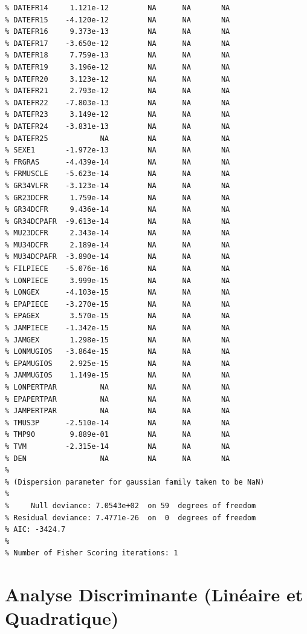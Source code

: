 \documentclass[
]{article}
\begin{document}
\begin{verbatim}
% DATEFR14     1.121e-12         NA      NA       NA
% DATEFR15    -4.120e-12         NA      NA       NA
% DATEFR16     9.373e-13         NA      NA       NA
% DATEFR17    -3.650e-12         NA      NA       NA
% DATEFR18     7.759e-13         NA      NA       NA
% DATEFR19     3.196e-12         NA      NA       NA
% DATEFR20     3.123e-12         NA      NA       NA
% DATEFR21     2.793e-12         NA      NA       NA
% DATEFR22    -7.803e-13         NA      NA       NA
% DATEFR23     3.149e-12         NA      NA       NA
% DATEFR24    -3.831e-13         NA      NA       NA
% DATEFR25            NA         NA      NA       NA
% SEXE1       -1.972e-13         NA      NA       NA
% FRGRAS      -4.439e-14         NA      NA       NA
% FRMUSCLE    -5.623e-14         NA      NA       NA
% GR34VLFR    -3.123e-14         NA      NA       NA
% GR23DCFR     1.759e-14         NA      NA       NA
% GR34DCFR     9.436e-14         NA      NA       NA
% GR34DCPAFR  -9.613e-14         NA      NA       NA
% MU23DCFR     2.343e-14         NA      NA       NA
% MU34DCFR     2.189e-14         NA      NA       NA
% MU34DCPAFR  -3.890e-14         NA      NA       NA
% FILPIECE    -5.076e-16         NA      NA       NA
% LONPIECE     3.999e-15         NA      NA       NA
% LONGEX      -4.103e-15         NA      NA       NA
% EPAPIECE    -3.270e-15         NA      NA       NA
% EPAGEX       3.570e-15         NA      NA       NA
% JAMPIECE    -1.342e-15         NA      NA       NA
% JAMGEX       1.298e-15         NA      NA       NA
% LONMUGIOS   -3.864e-15         NA      NA       NA
% EPAMUGIOS    2.925e-15         NA      NA       NA
% JAMMUGIOS    1.149e-15         NA      NA       NA
% LONPERTPAR          NA         NA      NA       NA
% EPAPERTPAR          NA         NA      NA       NA
% JAMPERTPAR          NA         NA      NA       NA
% TMUS3P      -2.510e-14         NA      NA       NA
% TMP90        9.889e-01         NA      NA       NA
% TVM         -2.315e-14         NA      NA       NA
% DEN                 NA         NA      NA       NA
% 
% (Dispersion parameter for gaussian family taken to be NaN)
% 
%     Null deviance: 7.0543e+02  on 59  degrees of freedom
% Residual deviance: 7.4771e-26  on  0  degrees of freedom
% AIC: -3424.7
% 
% Number of Fisher Scoring iterations: 1
\end{verbatim}

\pagebreak

\hypertarget{analyse-discriminante-linuxe9aire-et-quadratique}{%
\section{Analyse Discriminante (Linéaire et
Quadratique)}\label{analyse-discriminante-linuxe9aire-et-quadratique}}
\end{document}
